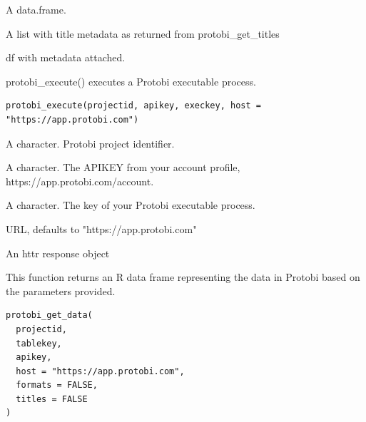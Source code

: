 \documentclass[a4paper]{book}
\begin{document}
%
\begin{Arguments}
\begin{ldescription}
\item[\code{df}] A data.frame.

\item[\code{titles}] A list with title metadata as returned from protobi\_get\_titles
\end{ldescription}
\end{Arguments}
%
\begin{Value}
df with metadata attached.
\end{Value}
%
\begin{Description}\relax
protobi\_execute() executes a Protobi executable process.
\end{Description}
%
\begin{Usage}
\begin{verbatim}
protobi_execute(projectid, apikey, execkey, host = "https://app.protobi.com")
\end{verbatim}
\end{Usage}
%
\begin{Arguments}
\begin{ldescription}
\item[\code{projectid}] A character. Protobi project identifier.

\item[\code{apikey}] A character. The APIKEY from your account profile, https://app.protobi.com/account.

\item[\code{execkey}] A character. The key of your Protobi executable process.

\item[\code{host}] URL, defaults to "https://app.protobi.com"
\end{ldescription}
\end{Arguments}
%
\begin{Value}
An httr response object
\end{Value}
%
\begin{Description}\relax
This function returns an R data frame representing the data in Protobi based on the parameters provided.
\end{Description}
%
\begin{Usage}
\begin{verbatim}
protobi_get_data(
  projectid,
  tablekey,
  apikey,
  host = "https://app.protobi.com",
  formats = FALSE,
  titles = FALSE
)
\end{verbatim}
\end{Usage}
\end{document}
